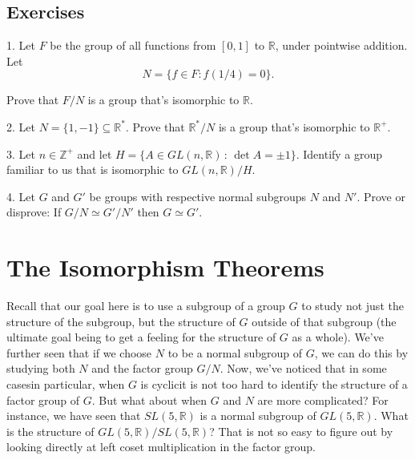 \documentclass[10pt,openany,oneside]{book}
\theoremstyle{plain}
\theoremstyle{definition}
\theoremstyle{definition}
\theoremstyle{definition}
\theoremstyle{definition}
\numberwithin{equation}{section}
\def\Z{\mathbb{Z}}
\def\R{\mathbb{R}}
\begin{document}
\section[{Exercises}]{Exercises}\label{exercises-9}
\begin{exerciselist}
\item[1.]\hypertarget{exercise-59}{}Let \(F\) be the group of all functions from \([0,1]\) to \(\R\), under pointwise addition. Let%
\begin{equation*}
N=\{f\in F:
f(1/4)=0\}.
\end{equation*}
%
\par
Prove that \(F/N\) is a group that's isomorphic to \(\R\).%
\par\smallskip
\item[2.]\hypertarget{exercise-60}{}Let \(N=\{1,-1\}\subseteq \R^*\). Prove that \(\R^*/N\) is a group that's isomorphic to \(\R^+\).%
\par\smallskip
\item[3.]\hypertarget{exercise-61}{}Let \(n\in \Z^+\) and let \(H=\{A\in GL(n,\R)\,:\, \det A =\pm
1\}\). Identify a group familiar to us that is isomorphic to \(GL(n,\R)/H\).%
\par\smallskip
\item[4.]\hypertarget{exercise-62}{}Let \(G\) and \(G'\) be groups with respective normal subgroups \(N\) and \(N'\). Prove or disprove: If \(G/N\simeq G'/N'\) then \(G\simeq
G'\).%
\par\smallskip
\end{exerciselist}
\typeout{************************************************}
\typeout{************************************************}
\chapter[{The Isomorphism Theorems}]{The Isomorphism Theorems}\label{isothms}
Recall that our goal here is to use a subgroup of a group \(G\) to study not just the structure of the subgroup, but the structure of \(G\) outside of that subgroup (the ultimate goal being to get a feeling for the structure of \(G\) as a whole). We've further seen that if we choose \(N\) to be a normal subgroup of \(G\), we can do this by studying both \(N\) and the factor group \(G/N\). Now, we've noticed that in some cases\textemdash{}in particular, when \(G\) is cyclic\textendash{}it is not too hard to identify the structure of a factor group of \(G\). But what about when \(G\) and \(N\) are more complicated? For instance, we have seen that \(SL(5,\R)\) is a normal subgroup of \(GL(5,\R)\). What is the structure of \(GL(5,\R)/SL(5,\R)\)? That is not so easy to figure out by looking directly at left coset multiplication in the factor group.%
\typeout{************************************************}
\typeout{************************************************}
\end{document}

